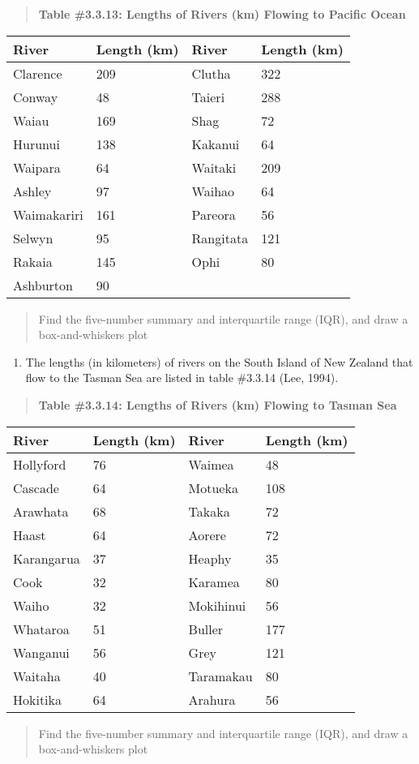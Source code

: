 \documentclass[]{book}
\providecommand{\tightlist}{%
  \setlength{\itemsep}{0pt}\setlength{\parskip}{0pt}}
\begin{document}
\begin{quote}
\textbf{Table \#3.3.13: Lengths of Rivers (km) Flowing to Pacific Ocean}
\end{quote}

\begin{longtable}[]{@{}llll@{}}
\toprule
River & Length (km) & River & Length (km)\tabularnewline
\midrule
\endhead
Clarence & 209 & Clutha & 322\tabularnewline
Conway & 48 & Taieri & 288\tabularnewline
Waiau & 169 & Shag & 72\tabularnewline
Hurunui & 138 & Kakanui & 64\tabularnewline
Waipara & 64 & Waitaki & 209\tabularnewline
Ashley & 97 & Waihao & 64\tabularnewline
Waimakariri & 161 & Pareora & 56\tabularnewline
Selwyn & 95 & Rangitata & 121\tabularnewline
Rakaia & 145 & Ophi & 80\tabularnewline
Ashburton & 90 & &\tabularnewline
\bottomrule
\end{longtable}

\begin{quote}
Find the five-number summary and interquartile range (IQR), and draw a
box-and-whiskers plot
\end{quote}

\begin{enumerate}
\def\labelenumi{\arabic{enumi}.}
\setcounter{enumi}{6}
\tightlist
\item
  The lengths (in kilometers) of rivers on the South Island of New
  Zealand that flow to the Tasman Sea are listed in table \#3.3.14
  (Lee, 1994).
\end{enumerate}

\begin{quote}
\textbf{Table \#3.3.14: Lengths of Rivers (km) Flowing to Tasman Sea}
\end{quote}

\begin{longtable}[]{@{}llll@{}}
\toprule
River & Length (km) & River & Length (km)\tabularnewline
\midrule
\endhead
Hollyford & 76 & Waimea & 48\tabularnewline
Cascade & 64 & Motueka & 108\tabularnewline
Arawhata & 68 & Takaka & 72\tabularnewline
Haast & 64 & Aorere & 72\tabularnewline
Karangarua & 37 & Heaphy & 35\tabularnewline
Cook & 32 & Karamea & 80\tabularnewline
Waiho & 32 & Mokihinui & 56\tabularnewline
Whataroa & 51 & Buller & 177\tabularnewline
Wanganui & 56 & Grey & 121\tabularnewline
Waitaha & 40 & Taramakau & 80\tabularnewline
Hokitika & 64 & Arahura & 56\tabularnewline
\bottomrule
\end{longtable}

\begin{quote}
Find the five-number summary and interquartile range (IQR), and draw a
box-and-whiskers plot
\end{quote}
\end{document}
